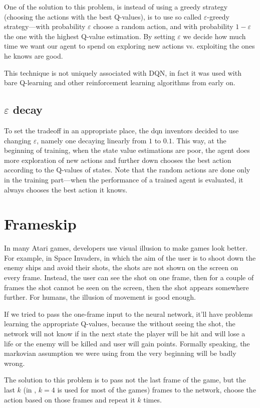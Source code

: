 One of the solution to this problem, is instead of using a greedy strategy (choosing the actions with the best Q-values), is to use so called $\varepsilon$-greedy strategy---with probability $\varepsilon$ choose a random action, and with probability $1 - \varepsilon$ the one with the highest Q-value estimation. By setting $\varepsilon$ we decide how much time we want our agent to spend on exploring new actions vs. exploiting the ones he knows are good.

This technique is not uniquely associated with DQN, in fact it was used with bare Q-learning and other reinforcement learning algorithms from early on.

\subsection{$\varepsilon$ decay}
To set the tradeoff in an appropriate place, the dqn inventors decided to use changing $\varepsilon$, namely one decaying linearly from $1$ to $0.1$. This way, at the beginning of training, when the state value estimations are poor, the agent does more exploration of new actions and further down chooses the best action according to the Q-values of states. Note that the random actions are done only in the training part---when the performance of a trained agent is evaluated, it always chooses the best action it knows.

\section{Frameskip}
In many Atari games, developers use visual illusion to make games look better. For example, in Space Invaders, in which the aim of the user is to shoot down the enemy ships and avoid their shots, the shots are not shown on the screen on every frame. Instead, the user can see the shot on one frame, then for a couple of frames the shot cannot be seen on the screen, then the shot appears somewhere further. For humans, the illusion of movement is good enough.

If we tried to pass the one-frame input to the neural network, it'll have problems learning the appropriate Q-values, because the without seeing the shot, the network will not know if in the next state the player will be hit and will lose a life or the enemy will be killed and user will gain points. Formally speaking, the markovian assumption we were using from the very beginning will be badly wrong.

The solution to this problem is to pass not the last frame of the game, but the last $k$ (in \cite{nips-dqn}, $k=4$ is used for most of the games) frames to the network, choose the action based on those frames and repeat it $k$ times.

